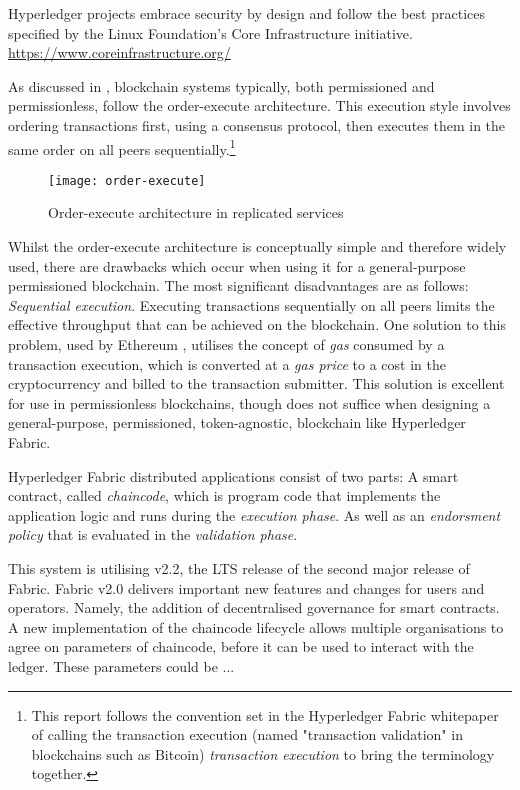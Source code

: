 Hyperledger projects embrace security by design and follow the best practices specified by the Linux Foundation's Core Infrastructure initiative. \url{https://www.coreinfrastructure.org/}

As discussed in \cite{androulaki_hyperledger_2018}, blockchain systems typically, both permissioned and permissionless, follow the order-execute architecture. This execution style involves ordering transactions first, using a consensus protocol, then executes them in the same order on all peers sequentially.\footnote{This report follows the convention set in the Hyperledger Fabric whitepaper of calling the transaction execution (named "transaction validation" in blockchains such as Bitcoin) \emph{transaction execution} to bring the terminology together.}
\begin{figure}[h]
  \texttt{[image: order-execute]}
  \caption{Order-execute architecture in replicated services}
\end{figure}

Whilst the order-execute architecture is conceptually simple and therefore widely used, there are drawbacks which occur when using it for a general-purpose permissioned blockchain.\cite{androulaki_hyperledger_2018}
The most significant disadvantages are as follows: 
\emph{Sequential execution}. Executing transactions sequentially on all peers limits the effective throughput that can be achieved on the blockchain.\cite{androulaki_hyperledger_2018} 
One solution to this problem, used by Ethereum \cite{wood_ethereum_nodate}, utilises the concept of \emph{gas} consumed by a transaction execution, which is converted at a \emph{gas price} to a cost in the cryptocurrency and billed to the transaction submitter.
This solution is excellent for use in permissionless blockchains, though does not suffice when designing a general-purpose, permissioned, token-agnostic, blockchain like Hyperledger Fabric. \cite{androulaki_hyperledger_2018} \linebreak[1]

Hyperledger Fabric distributed applications consist of two parts: A smart contract, called \emph{chaincode}, which is program code that implements the application logic and runs during the \emph{execution phase}.
As well as an \emph{endorsment policy} that is evaluated in the \emph{validation phase}. \cite{androulaki_hyperledger_2018} \linebreak[1]

This system is utilising v2.2, the LTS release of the second major release of Fabric. 
Fabric v2.0 delivers important new features and changes for users and operators. %
Namely, the addition of decentralised governance for smart contracts. 
A new implementation of the chaincode lifecycle allows multiple organisations to agree on parameters of chaincode, before it can be used to interact with the ledger. 
These parameters could be ... %
\cite{noauthor_whats_nodate}


